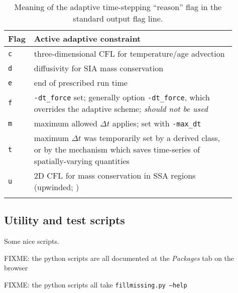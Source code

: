 \begin{table}[ht]
\caption{Meaning of the adaptive time-stepping ``reason'' flag in the standard output flag line.}\label{tab:adaptiveflag}
\begin{tabular}{p{0.05\linewidth}p{0.85\linewidth}}\hline
\textbf{Flag} & \textbf{Active adaptive constraint} \\ \hline
\verb|c| & three-dimensional CFL for temperature/age advection \cite{BBL} \\
\verb|d| & diffusivity for SIA mass conservation \cite{BBL,HindmarshPayne} \\
\verb|e| & end of prescribed run time \\
\verb|f| & \verb|-dt_force| set; generally option \verb|-dt_force|, which overrides the adaptive scheme; \emph{should not be used}  \\
\verb|m| & maximum allowed $\Delta t$ applies; set with \verb|-max_dt| \\
\verb|t| & maximum $\Delta t$ was temporarily set by a derived class, or by the mechanism which saves time-series of spatially-varying quantities \\
\verb|u| & 2D CFL for mass conservation in SSA regions (upwinded; \cite{BBssasliding})\\
\hline
\normalsize
\end{tabular}
\end{table}


\subsection{Utility and test scripts} \label{subsect:scripts} Some nice scripts.
 
FIXME: the python scripts are all documented at the \textsl{Packages} tab on the browser

FIXME: the python scripts all take \texttt{fill\und missing.py --help}

\newcommand{\scripthead}[1]{\texttt{#1}}

